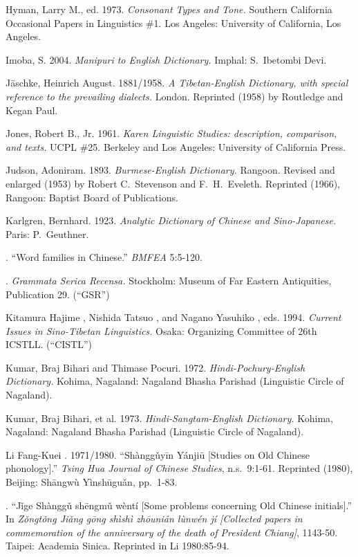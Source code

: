 Hyman, Larry M., ed.
1973.
\textit{Consonant Types and Tone.}
Southern California Occasional Papers in Linguistics \#1. Los Angeles: University of California, Los Angeles.

Imoba, S.
2004.
\textit{Manipuri to English Dictionary.}
Imphal: S.~Ibetombi Devi.

Jäschke, Heinrich August.
1881/1958.
\textit{A Tibetan-English Dictionary, with special reference to the prevailing dialects.}
London. Reprinted (1958) by Routledge and Kegan Paul.

Jones, Robert B., Jr.
1961.
\textit{Karen Linguistic Studies:  description, comparison, and texts.}
UCPL \#25.  Berkeley and Los Angeles: University of California Press.

Judson, Adoniram.
1893.
\textit{Burmese-English Dictionary.}
Rangoon. Revised and enlarged (1953) by Robert C.\ Stevenson and F.\ H.\ Eveleth. Reprinted (1966), Rangoon: Baptist Board of Publications.

Karlgren, Bernhard.
1923.
\textit{Analytic Dictionary of Chinese and Sino-Japanese.}
Paris: P.~Geuthner.

.
“Word families in Chinese.”
\textit{BMFEA} 5:5-120.

.
\textit{Grammata Serica Recensa.}
Stockholm: Museum of Far Eastern Antiquities, Publication 29. (“GSR”)

Kitamura Hajime , Nishida Tatsuo , and Nagano Yasuhiko , eds.
1994.
\textit{Current Issues in Sino-Tibetan Linguistics.}
Osaka: Organizing Committee of 26th ICSTLL. (“CISTL”)

Kumar, Braj Bihari and Thimase Pocuri.
1972.
\textit{Hindi-Pochury-English Dictionary.}
Kohima, Nagaland: Nagaland Bhasha Parishad (Linguistic Circle of Nagaland).

Kumar, Braj Bihari, et al.
1973.
\textit{Hindi-Sangtam-English Dictionary.}
Kohima, Nagaland: Nagaland Bhasha Parishad (Linguistic Circle of Nagaland).

Li Fang-Kuei .
1971/1980.
 “Shànggǔyīn Yánjiū [Studies on Old Chinese phonology].”
\textit{Tsing Hua Journal of Chinese Studies}, n.s.~9:1-61. Reprinted (1980), Beijing:  Shāngwù Yìnshūguǎn, pp.\ 1-83.

.
 “Jǐge Shànggǔ shēngmǔ wèntí [Some problems concerning Old Chinese initials].”
In  \textit{Zǒngtǒng Jiǎng gōng shìshì zhōunián lùnwén jí [Collected papers in commemoration of the anniversary of the death of President Chiang]}, 1143-50. Taipei: Academia Sinica. Reprinted in Li 1980:85-94.

